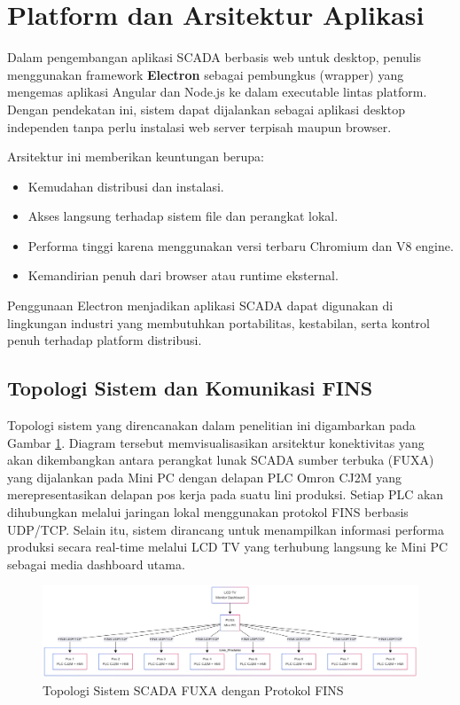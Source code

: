 \section{Platform dan Arsitektur Aplikasi}
Dalam pengembangan aplikasi SCADA berbasis web untuk desktop, penulis menggunakan framework \textbf{Electron} sebagai pembungkus (wrapper) yang mengemas aplikasi Angular dan Node.js ke dalam executable lintas platform. Dengan pendekatan ini, sistem dapat dijalankan sebagai aplikasi desktop independen tanpa perlu instalasi web server terpisah maupun browser.

Arsitektur ini memberikan keuntungan berupa:
\begin{itemize}
\item Kemudahan distribusi dan instalasi.
\item Akses langsung terhadap sistem file dan perangkat lokal.
\item Performa tinggi karena menggunakan versi terbaru Chromium dan V8 engine.
\item Kemandirian penuh dari browser atau runtime eksternal.
\end{itemize}

Penggunaan Electron menjadikan aplikasi SCADA dapat digunakan di lingkungan industri yang membutuhkan portabilitas, kestabilan, serta kontrol penuh terhadap platform distribusi.

\subsection{Topologi Sistem dan Komunikasi FINS}

Topologi sistem yang direncanakan dalam penelitian ini digambarkan pada Gambar \ref{fig:topologi}. Diagram tersebut memvisualisasikan arsitektur konektivitas yang akan dikembangkan antara perangkat lunak SCADA sumber terbuka (FUXA) yang dijalankan pada Mini PC dengan delapan PLC Omron CJ2M yang merepresentasikan delapan pos kerja pada suatu lini produksi. Setiap PLC akan dihubungkan melalui jaringan lokal menggunakan protokol FINS berbasis UDP/TCP. Selain itu, sistem dirancang untuk menampilkan informasi performa produksi secara real-time melalui LCD TV yang terhubung langsung ke Mini PC sebagai media dashboard utama.

\begin{figure}[H]
\centering
\includegraphics[width=\textwidth]{images/topologi_fuxa_fins.png} %
\caption{Topologi Sistem SCADA FUXA dengan Protokol FINS}
\label{fig:topologi}
\end{figure}

